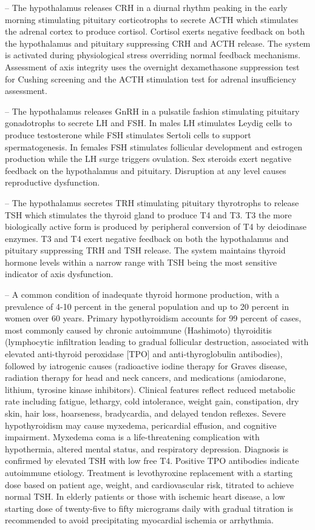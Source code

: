 -- The hypothalamus releases CRH in a diurnal rhythm peaking in the early morning stimulating pituitary corticotrophs to secrete ACTH which stimulates the adrenal cortex to produce cortisol. Cortisol exerts negative feedback on both the hypothalamus and pituitary suppressing CRH and ACTH release. The system is activated during physiological stress overriding normal feedback mechanisms. Assessment of axis integrity uses the overnight dexamethasone suppression test for Cushing screening and the ACTH stimulation test for adrenal insufficiency assessment.

-- The hypothalamus releases GnRH in a pulsatile fashion stimulating pituitary gonadotrophs to secrete LH and FSH. In males LH stimulates Leydig cells to produce testosterone while FSH stimulates Sertoli cells to support spermatogenesis. In females FSH stimulates follicular development and estrogen production while the LH surge triggers ovulation. Sex steroids exert negative feedback on the hypothalamus and pituitary. Disruption at any level causes reproductive dysfunction.

-- The hypothalamus secretes TRH stimulating pituitary thyrotrophs to release TSH which stimulates the thyroid gland to produce T4 and T3. T3 the more biologically active form is produced by peripheral conversion of T4 by deiodinase enzymes. T3 and T4 exert negative feedback on both the hypothalamus and pituitary suppressing TRH and TSH release. The system maintains thyroid hormone levels within a narrow range with TSH being the most sensitive indicator of axis dysfunction.

-- A common condition of inadequate thyroid hormone production, with a prevalence of 4-10 percent in the general population and up to 20 percent in women over 60 years. Primary hypothyroidism accounts for 99 percent of cases, most commonly caused by chronic autoimmune (Hashimoto) thyroiditis (lymphocytic infiltration leading to gradual follicular destruction, associated with elevated anti-thyroid peroxidase [TPO] and anti-thyroglobulin antibodies), followed by iatrogenic causes (radioactive iodine therapy for Graves disease, radiation therapy for head and neck cancers, and medications (amiodarone, lithium, tyrosine kinase inhibitors). Clinical features reflect reduced metabolic rate including fatigue, lethargy, cold intolerance, weight gain, constipation, dry skin, hair loss, hoarseness, bradycardia, and delayed tendon reflexes. Severe hypothyroidism may cause myxedema, pericardial effusion, and cognitive impairment. Myxedema coma is a life-threatening complication with hypothermia, altered mental status, and respiratory depression. Diagnosis is confirmed by elevated TSH with low free T4. Positive TPO antibodies indicate autoimmune etiology. Treatment is levothyroxine replacement with a starting dose based on patient age, weight, and cardiovascular risk, titrated to achieve normal TSH. In elderly patients or those with ischemic heart disease, a low starting dose of twenty-five to fifty micrograms daily with gradual titration is recommended to avoid precipitating myocardial ischemia or arrhythmia.

